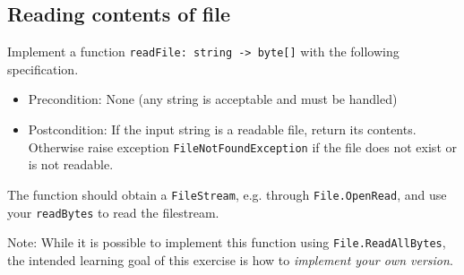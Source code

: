 \subsection*{Reading contents of file}

Implement a function \texttt{readFile: string -> byte[]} with the following specification. 
\begin{itemize}
\item Precondition: None (any string is acceptable and must be handled)
\item Postcondition: If the input string is a readable file, return its contents.  Otherwise raise exception \texttt{FileNotFoundException} if the file does not exist or is not readable.
\end{itemize}

The function should obtain a \texttt{FileStream}, e.g. through \texttt{File.OpenRead}, and use your \texttt{readBytes} to read the filestream.

Note: While it is possible to implement this function using \texttt{File.ReadAllBytes}, the intended learning goal of this exercise is how to \textit{implement your own version}.
